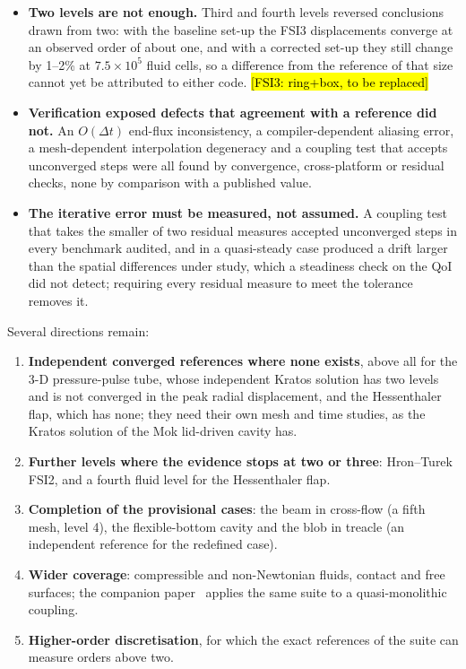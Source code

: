 \documentclass[sn-mathphys,Numbered]{sn-jnl}%
\begin{document}
\begin{itemize}
	\item \textbf{Two levels are not enough.} Third and fourth levels reversed conclusions drawn from two: with the baseline set-up the FSI3 displacements converge at an observed order of about one, and with a corrected set-up they still change by 1--2\% at $7.5\times10^5$ fluid cells, so a difference from the reference of that size cannot yet be attributed to either code. \hl{[FSI3: ring+box, to be replaced]}
	\item \textbf{Verification exposed defects that agreement with a reference did not.} An $O(\Delta t)$ end-flux inconsistency, a compiler-dependent aliasing error, a mesh-dependent interpolation degeneracy and a coupling test that accepts unconverged steps were all found by convergence, cross-platform or residual checks, none by comparison with a published value.
	\item \textbf{The iterative error must be measured, not assumed.} A coupling test that takes the smaller of two residual measures accepted unconverged steps in every benchmark audited, and in a quasi-steady case produced a drift larger than the spatial differences under study, which a steadiness check on the QoI did not detect; requiring every residual measure to meet the tolerance removes it.
\end{itemize}

Several directions remain:
\begin{enumerate}
	\item \textbf{Independent converged references where none exists}, above all for the 3-D pressure-pulse tube, whose independent Kratos solution has two levels and is not converged in the peak radial displacement, and the Hessenthaler flap, which has none; they need their own mesh and time studies, as the Kratos solution of the Mok lid-driven cavity has.
	\item \textbf{Further levels where the evidence stops at two or three}: Hron--Turek FSI2, and a fourth fluid level for the Hessenthaler flap.
	\item \textbf{Completion of the provisional cases}: the beam in cross-flow (a fifth mesh, level 4), the flexible-bottom cavity and the blob in treacle (an independent reference for the redefined case).
	\item \textbf{Wider coverage}: compressible and non-Newtonian fluids, contact and free surfaces; the companion paper~\citep{CardiffBatistic2026QM} applies the same suite to a quasi-monolithic coupling.
	\item \textbf{Higher-order discretisation}, for which the exact references of the suite can measure orders above two.
\end{enumerate}
\end{document}
